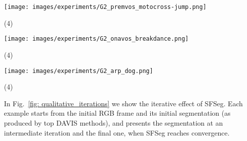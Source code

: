\documentclass{article}
\begin{document}
\begin{figure*}[!t]
     \begin{minipage}[t]{0.32\linewidth}
     \raggedright
        \texttt{[image: images/experiments/G2\_premvos\_motocross-jump.png]}
        \vspace*{-2mm}
        \begin{tasks}(4)
          \task[Input]
          \task[SFSeg]
          \task[GT]
        \end{tasks}
	\end{minipage}
	\begin{minipage}[t]{0.32\linewidth}
	\centering
        \texttt{[image: images/experiments/G2\_onavos\_breakdance.png]}
        \vspace*{-2mm}
        \begin{tasks}(4)
          \task[Input]
          \task[SFSeg]
          \task[GT]
        \end{tasks}
	\end{minipage}
  	\begin{minipage}[t]{0.32\linewidth}
  	\raggedleft
         \texttt{[image: images/experiments/G2\_arp\_dog.png]}
        \vspace*{-2mm}
        \begin{tasks}(4)
          \task[Input]
          \task[SFSeg]
          \task[GT]
        \end{tasks}
	\end{minipage}
	\caption{We show the output of SFSeg (col 3) over the input masks (col 2) received from top DAVIS-2016 solutions in various video frames (col 1). We see how the quality of the masks is increasing, bringing the input masks closer to ground truth (col 4). 1. PReMVOS - $3^{rd}$ place on semi-supervised (motocross-jump); 2. OnAVOS   - $1^{st}$ place on semi-supervised (breakdance); 3. ARP - $2^{nd}$ place on unsupervised (dog).}
	\label{fig: qualitative_hard}
\end{figure*}
In Fig.~\ref{fig: qualitative_iterations} we show the iterative effect of SFSeg. Each example starts from the initial RGB frame and its initial segmentation (as produced by top DAVIS methods), and presents the segmentation at an intermediate iteration and the final one, when SFSeg reaches convergence.
\end{document}
